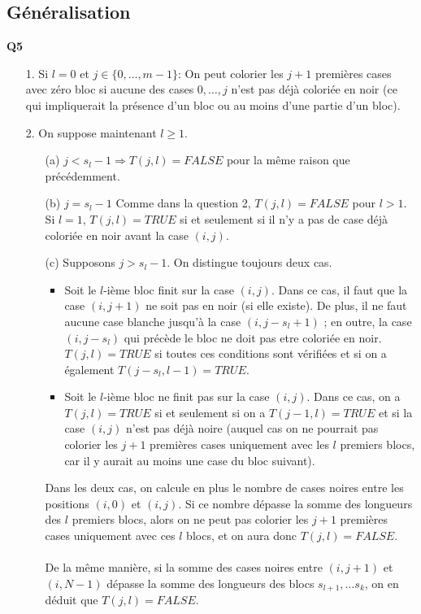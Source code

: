 \documentclass[10pt,a4paper]{article}
\begin{document}
\subsection{Généralisation}
\noindent\textbf{Q5} \\
\begin{itemize}
	\item[1.] Si $l = 0$ et $j \in \lbrace 0, \hdots, m-1 \rbrace$: On peut colorier les $j+1$ premières cases avec zéro bloc si aucune des cases $0, \hdots, j$ n'est pas déjà coloriée en noir (ce qui impliquerait la présence d'un bloc ou au moins d'une partie d'un bloc). \\
	\item[2.] On suppose maintenant $l \geq 1$.
	\begin{itemize}
		\item[(a)] $j < s_l - 1 \Rightarrow T(j,l) = FALSE $ pour la même raison que précédemment.
		\item[(b)] $j = s_l -1$ Comme dans la question 2, $T(j,l) = FALSE $ pour $l>1$. Si $l=1$, $T(j,l) = TRUE$ si et seulement si il n'y a pas de case déjà coloriée en noir avant la case $(i,j)$.
		\item[(c)] Supposons $j > s_l -1$. On distingue toujours deux cas. 
		\begin{itemize}
		\item Soit le $l$-ième bloc finit sur la case $(i,j)$. Dans ce cas, il faut que la case $(i,j+1)$ ne soit pas en noir (si elle existe). De plus, il ne faut aucune case blanche jusqu'à la case $(i,j-s_l+1)$ ; en outre, la case $(i,j-s_l)$ qui précède le bloc ne doit pas etre coloriée en noir. $T(j,l) = TRUE$ si toutes ces conditions sont vérifiées et si on a également $T(j-s_l, l-1) = TRUE$. 
		\item Soit le $l$-ième bloc ne finit pas sur la case $(i,j)$. Dans ce cas, on a $T(j,l) = TRUE$ si et seulement si on a $T(j-1,l) = TRUE$ et si la case $(i,j)$ n'est pas déjà noire (auquel cas on ne pourrait pas colorier les $j+1$ premières cases uniquement avec les $l$ premiers blocs, car il y aurait au moins une case du bloc suivant).	\\	
		
		\end{itemize}
Dans les deux cas, on calcule en plus le nombre de cases noires entre les positions $(i,0)$ et $(i,j)$. Si ce nombre dépasse la somme des longueurs des $l$ premiers blocs, alors on ne peut pas colorier les $j+1$ premières cases uniquement avec ces $l$ blocs, et on aura donc $T(j,l) = FALSE$. \\ \\
\noindent
De la même manière, si la somme des cases noires entre $(i,j+1) $ et $(i,N-1)$ dépasse la somme des longueurs des blocs $s_{l+1}, \hdots s_k$, on en déduit que $T(j,l) = FALSE$. 
	\end{itemize}
\end{itemize}
\end{document}
